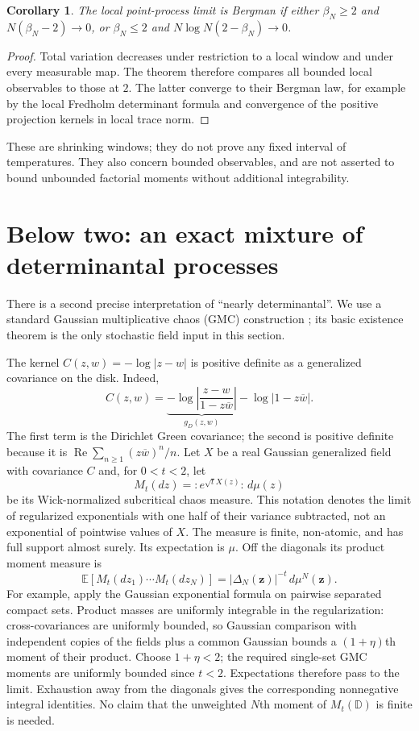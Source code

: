 \documentclass[11pt]{article}
\newtheorem{corollary}[theorem]{Corollary}
\theoremstyle{remark}\newtheorem{remark}[theorem]{Remark}
\newcommand{\D}{\mathbb D}
\newcommand{\E}{\mathbb E}
\newcommand{\Rea}{\operatorname{Re}}
\begin{document}
\begin{corollary}
The local point-process limit is Bergman if either
$\beta_N\ge2$ and $N(\beta_N-2)\to0$, or
$\beta_N\le2$ and $N\log N(2-\beta_N)\to0$.
\end{corollary}
\begin{proof}
Total variation decreases under restriction to a local window and under
every measurable map. The theorem therefore compares all bounded local
observables to those at $2$. The latter converge to their Bergman law,
for example by the local Fredholm determinant formula and convergence of
the positive projection kernels in local trace norm.
\end{proof}
These are shrinking windows; they do not prove any fixed interval of
temperatures. They also concern bounded observables, and are not asserted
to bound unbounded factorial moments without additional integrability.

\section{Below two: an exact mixture of determinantal processes}
There is a second precise interpretation of ``nearly determinantal''.
We use a standard Gaussian multiplicative chaos (GMC) construction
\cite{RV,RobertVargas}; its basic existence theorem is the only stochastic
field input in this section.

The kernel $C(z,w)=-\log|z-w|$ is positive definite as a generalized
covariance on the disk. Indeed,
\[
 C(z,w)=\underbrace{-\log\left|\frac{z-w}{1-z\overline w}\right|}_{g_D(z,w)}
       -\log|1-z\overline w|.
\]
The first term is the Dirichlet Green covariance; the second is positive
definite because it is
$\Rea\sum_{n\ge1}(z\overline w)^n/n$.
Let $X$ be a real Gaussian generalized field with covariance $C$ and, for
$0<t<2$, let
\[
 M_t(dz)={:}e^{\sqrt t X(z)}{:}\,d\mu(z)
\]
be its Wick-normalized subcritical chaos measure. This notation denotes
the limit of regularized exponentials with one half of their variance
subtracted, not an exponential of pointwise values of $X$.
The measure is finite, non-atomic, and has full support almost surely.
Its expectation is $\mu$. Off the diagonals its product moment measure is
\begin{equation}\label{gmc_moment}
 \E[M_t(dz_1)\cdots M_t(dz_N)]
    =|\Delta_N(\mathbf z)|^{-t}\,d\mu^N(\mathbf z).
\end{equation}
For example, apply the Gaussian exponential formula on pairwise separated
compact sets. Product masses are uniformly integrable in the regularization:
cross-covariances are uniformly bounded, so Gaussian comparison with
independent copies of the fields plus a common Gaussian bounds a
$(1+\eta)$th moment of their product. Choose $1+\eta<2$; the required
single-set GMC moments are uniformly bounded since $t<2$. Expectations
therefore pass to the limit. Exhaustion away from the diagonals gives the
corresponding nonnegative integral identities. No
claim that the unweighted $N$th moment of $M_t(\D)$ is finite is needed.
\end{document}
